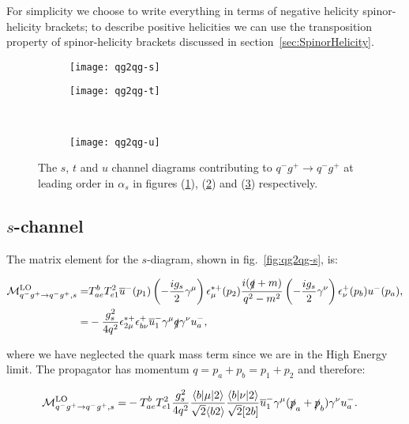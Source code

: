 	For simplicity we choose to write everything in terms of negative helicity spinor-helicity brackets;
	to describe positive helicities we can use the transposition property of spinor-helicity brackets discussed
	in section~\ref{sec:SpinorHelicity}.

	\begin{figure}[h]
		\centering
		\begin{subfigure}[b]{0.3\textwidth}
			\texttt{[image: qg2qg-s]}
			\caption{}
			\label{fig:qg2qg-s}
		\end{subfigure}

		\begin{subfigure}[b]{0.3\textwidth}
			\texttt{[image: qg2qg-t]}
			\caption{}
			\label{fig:qg2qg-t}
		\end{subfigure}
		~
		\begin{subfigure}[b]{0.3\textwidth}
			\texttt{[image: qg2qg-u]}
			\caption{}
			\label{fig:qg2qg-u}
		\end{subfigure}
		\caption{The $s$, $t$ and $u$ channel diagrams contributing to $q^-g^+\to q^-g^+$ at leading
		         order in $\alpha_s$ in figures (\ref{fig:qg2qg-s}), (\ref{fig:qg2qg-t}) and (\ref{fig:qg2qg-u})
		         respectively.}
		\label{fig:TwoToTwo2}
	\end{figure}

	\subsection{$s$-channel}

		The matrix element for the $s$-diagram, shown in fig.~\eqref{fig:qg2qg-s}, is:

		\begin{align}
			\mathcal{M}_{q^-g^+\to q^-g^+, s}^{\text{LO}}=&T^b_{ae}T^2_{e1}\overline{u}^-(p_1)\left(-\frac{ig_s}{2}\gamma^\mu\right)\epsilon_\mu^{*+}(p_2)
				\frac{i(\slashed q+m)}{q^2-m^2}\left(-\frac{ig_s}{2}\gamma^\nu\right)\epsilon^+_\nu(p_b)u^-(p_a), \\
			=&-\frac{g^2_s}{4q^2}\epsilon^{*+}_{2\mu}\epsilon^+_{b\nu}\overline{u}^-_1\gamma^\mu\slashed q\gamma^\nu u^-_a,
		\end{align}

		where we have neglected the quark mass term since we are in the High Energy limit.
		The propagator has momentum $q=p_a+p_b=p_1+p_2$ and therefore:

		\begin{align}
			\mathcal{M}_{q^-g^+\to q^-g^+, s}^{\text{LO}}=&-T^b_{ae}T^2_{e1}\frac{g^2_s}{4q^2}\frac{\langle{b}|\mu|2\rangle}{\sqrt{2}\langle{b2\rangle}}
			\frac{\langle{b}|\nu|2\rangle}{\sqrt{2}[2b]}\overline{u}^-_1\gamma^\mu(\slashed{p}_a+\slashed{p}_b)\gamma^\nu u^-_a.
		\end{align}


